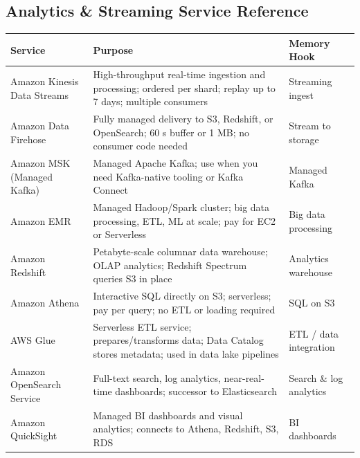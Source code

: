 

\subsection{Analytics \& Streaming Service Reference}

\begin{comparebox}[title={Analytics services --- purpose and memory hook}]
\begin{tabular}{@{}p{3.5cm}p{5cm}p{3cm}@{}}
\toprule
\textbf{Service} & \textbf{Purpose} & \textbf{Memory Hook} \\
\midrule
Amazon Kinesis Data Streams
  & High-throughput real-time ingestion and processing; ordered per shard;
    replay up to 7 days; multiple consumers
  & Streaming ingest \\[4pt]
Amazon Data Firehose
  & Fully managed delivery to S3, Redshift, or OpenSearch; 60 s buffer or
    1 MB; no consumer code needed
  & Stream to storage \\[4pt]
Amazon MSK (Managed Kafka)
  & Managed Apache Kafka; use when you need Kafka-native tooling or Kafka
    Connect
  & Managed Kafka \\[4pt]
Amazon EMR
  & Managed Hadoop/Spark cluster; big data processing, ETL, ML at scale;
    pay for EC2 or Serverless
  & Big data processing \\[4pt]
Amazon Redshift
  & Petabyte-scale columnar data warehouse; OLAP analytics; Redshift Spectrum
    queries S3 in place
  & Analytics warehouse \\[4pt]
Amazon Athena
  & Interactive SQL directly on S3; serverless; pay per query; no ETL or
    loading required
  & SQL on S3 \\[4pt]
AWS Glue
  & Serverless ETL service; prepares/transforms data; Data Catalog stores
    metadata; used in data lake pipelines
  & ETL / data integration \\[4pt]
Amazon OpenSearch Service
  & Full-text search, log analytics, near-real-time dashboards; successor
    to Elasticsearch
  & Search \& log analytics \\[4pt]
Amazon QuickSight
  & Managed BI dashboards and visual analytics; connects to Athena,
    Redshift, S3, RDS
  & BI dashboards \\[4pt]
\bottomrule
\end{tabular}
\end{comparebox}

